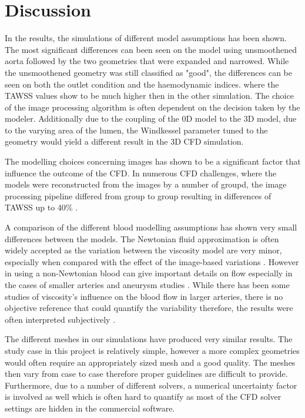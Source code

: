 \chapter{Discussion}
\label{chapterlabel7}

In the results, the simulations of different model assumptions has been shown. The most significant differences can been seen on the model using unsmoothened aorta followed by the two geometries that were expanded and narrowed. While the unsmoothened geometry was still classified as "good", the differences can be seen on both the outlet condition and the haemodynamic indices. where the TAWSS values show to be much higher then in the other simulation. The choice of the image processing algorithm is often dependent on the decision taken by the modeler. Additionally due to the coupling of the 0D model to the 3D model, due to the varying area of the lumen, the Windkessel parameter tuned to the geometry would yield a different result in the 3D CFD simulation.\par

The modelling choices concerning images has shown to be a significant factor that influence the outcome of the CFD. In numerous CFD challenges, where the models were reconstructed from the images by a number of groupd, the image processing pipeline differed from group to group resulting in differences of TAWSS up to 40\% \cite{Steinman2018Editorial:Utility, Huberts2018WhatPaper}.\par

A comparison of the different blood modelling assumptions has shown very small differences between the models. The Newtonian fluid approximation is often widely accepted as the variation between the viscosity model are very minor, especially when compared with the effect of the image-based variations \cite{Steinman2019HowVariability, Lee2007OnBifurcation}. However in using a non-Newtonian blood can give important details on flow especially in the cases of smaller arteries and aneurysm studies \cite{Johnston2006Non-NewtonianSimulations, Steinman2012AssumptionsHemodynamics}. While there has been some studies of viscosity's influence on the blood flow in larger arteries, there is no objective reference that could quantify the variability therefore, the results were often interpreted subjectively \cite{Steinman2012AssumptionsHemodynamics}.\par

The different meshes in our simulations have produced very similar results. The study case in this project is relatively simple, however a more complex geometries would often require an appropriately sized mesh and a good quality. The meshes then vary from case to case therefore proper guidelines are difficult to provide. Furthermore, due to a number of different solvers, a numerical uncertainty factor is involved as well which is often hard to quantify as most of the CFD solver settings are hidden in the commercial software. \par